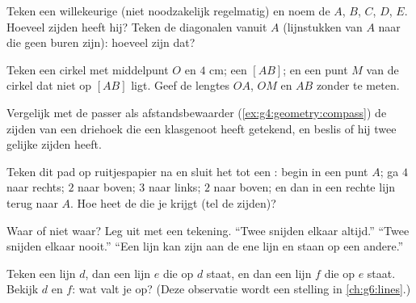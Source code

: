 \begin{exercise}[$\star$]\label{exo:g4:geometry:4}
Teken een willekeurige  (niet noodzakelijk regelmatig) en noem de
 $A$, $B$, $C$, $D$, $E$. Hoeveel zijden heeft hij? Teken de
diagonalen vanuit $A$ (lijnstukken van $A$ naar  die geen buren
zijn): hoeveel zijn dat?
\end{exercise}

\begin{exercise}[$\star$]\label{exo:g4:geometry:5}
Teken een cirkel met middelpunt $O$ en  $4$ cm; een  $[AB]$;
en een punt $M$ van de cirkel dat niet op $[AB]$ ligt. Geef de lengtes
$OA$, $OM$ en $AB$ zonder te meten.
\end{exercise}

\begin{exercise}[$\star$]\label{exo:g4:geometry:6}
Vergelijk met de passer als afstandsbewaarder
(\cref{ex:g4:geometry:compass}) de zijden van een driehoek die een
klasgenoot heeft getekend, en beslis of hij twee gelijke zijden heeft.
\end{exercise}

\begin{exercise}[$\star$]\label{exo:g4:geometry:7}
Teken dit pad op ruitjespapier na en sluit het tot een : begin in
een punt $A$; ga $4$ naar rechts; $2$ naar boven; $3$ naar links; $2$ naar
boven; en dan in een rechte lijn terug naar $A$. Hoe heet de  die
je krijgt (tel de zijden)?
\end{exercise}

\begin{exercise}[$\star$]\label{exo:g4:geometry:8}
Waar of niet waar? Leg uit met een tekening.
``Twee  snijden elkaar altijd.''
``Twee  snijden elkaar nooit.''
``Een lijn kan  zijn aan de ene lijn en  staan op een
andere.''
\end{exercise}

\begin{exercise}[$\star\star$]\label{exo:g4:geometry:9}
Teken een lijn $d$, dan een lijn $e$ die  op $d$ staat, en dan een
lijn $f$ die  op $e$ staat. Bekijk $d$ en $f$: wat valt je op?
(Deze observatie wordt een stelling in \cref{ch:g6:lines}.)
\end{exercise}

